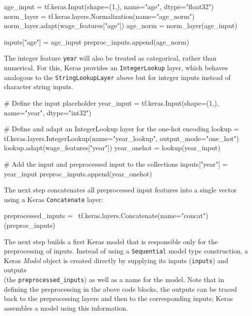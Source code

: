 \begin{samepage}
\begin{pythoncode}
age_input = tf.keras.Input(shape=(1,), name="age", dtype="float32")
norm_layer = tf.keras.layers.Normalization(name="age_norm")
norm_layer.adapt(wage_features["age"])
age_norm = norm_layer(age_input)

inputs["age"] = age_input
preproc_inputs.append(age_norm)
\end{pythoncode}
\end{samepage}

The integer feature \texttt{year} will also be treated as categorical, rather than numerical. For this, Keras provides an \texttt{IntegerLookup} layer, which behaves analogous to the \texttt{StringLookupLayer} above but for integer inputs instead of character string inputs.

\begin{samepage}
\begin{pythoncode}
# Define the input placeholder
year_input = tf.keras.Input(shape=(1,), name="year", dtype="int32")

# Define and adapt an IntegerLookup layer for the one-hot encoding
lookup = tf.keras.layers.IntegerLookup(name="year_lookup",
                                       output_mode="one_hot")
lookup.adapt(wage_features["year"])
year_onehot = lookup(year_input)

# Add the input and preprocessed input to the collections
inputs["year"] = year_input
preproc_inputs.append(year_onehot)
\end{pythoncode}
\end{samepage}

The next step concatenates all preprocessed input features into a single vector using a Keras \texttt{Concatenate} layer:

\begin{samepage}
\begin{pythoncode}
preprocessed_inputs = \
    tf.keras.layers.Concatenate(name="concat")(preproc_inputs)
\end{pythoncode}
\end{samepage}

The next step builds a first Keras model that is responsible only for the preprocessing of inputs. Instead of using a \texttt{Sequential} model type construction, a Keras \emph{Model} object is created directly by supplying its inputs (\texttt{inputs}) and outputs \\(the \texttt{preprocessed\_inputs}) as well as a name for the model. Note that in defining the preprocessing in the above code blocks, the outputs can be traced back to the preprocessing layers and then to the corresponding inputs; Keras assembles a model using this information.

